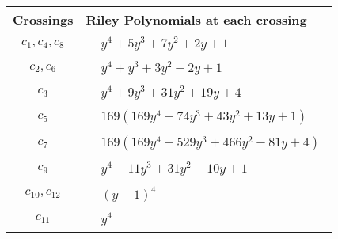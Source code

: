 \documentclass[1p]{elsarticle_modified}
\theoremstyle{definition}
\begin{document}
\begin{tabular}{m{50pt}|m{274pt}}
Crossings & \hspace{64pt}Riley Polynomials at each crossing \\
\hline $$\begin{aligned}c_{1},c_{4},c_{8}\end{aligned}$$&$\begin{aligned}
&y^4+5 y^3+7 y^2+2 y+1
\end{aligned}$\\
\hline $$\begin{aligned}c_{2},c_{6}\end{aligned}$$&$\begin{aligned}
&y^4+y^3+3 y^2+2 y+1
\end{aligned}$\\
\hline $$\begin{aligned}c_{3}\end{aligned}$$&$\begin{aligned}
&y^4+9 y^3+31 y^2+19 y+4
\end{aligned}$\\
\hline $$\begin{aligned}c_{5}\end{aligned}$$&$\begin{aligned}
&169(169 y^4-74 y^3+43 y^2+13 y+1)
\end{aligned}$\\
\hline $$\begin{aligned}c_{7}\end{aligned}$$&$\begin{aligned}
&169(169 y^4-529 y^3+466 y^2-81 y+4)
\end{aligned}$\\
\hline $$\begin{aligned}c_{9}\end{aligned}$$&$\begin{aligned}
&y^4-11 y^3+31 y^2+10 y+1
\end{aligned}$\\
\hline $$\begin{aligned}c_{10},c_{12}\end{aligned}$$&$\begin{aligned}
&(y-1)^4
\end{aligned}$\\
\hline $$\begin{aligned}c_{11}\end{aligned}$$&$\begin{aligned}
&y^4
\end{aligned}$\\
\hline
\end{tabular}\\~\\
\end{document}
